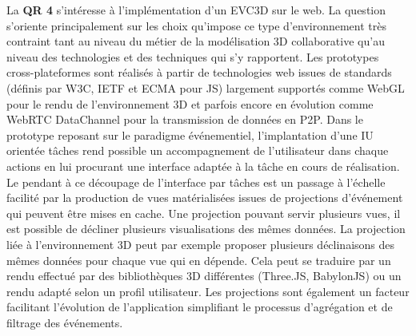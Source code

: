 La \textbf{QR 4} s'intéresse à l'implémentation d'un \gls{EVC3D} sur le web. La 
question s'oriente principalement sur les choix qu'impose ce type d'environnement 
très contraint tant au niveau du métier de la modélisation 3D collaborative 
qu'au niveau des technologies et des techniques qui s'y rapportent.
Les prototypes cross-plateformes sont réalisés à partir de 
technologies web issues de standards (définis par \gls{W3C}, \gls{IETF} et 
\acrshort{ECMA} 
pour \gls{JS}) largement supportés comme WebGL pour le rendu de 
l'environnement 3D et parfois encore en évolution comme WebRTC DataChannel 
pour la transmission de données en \gls{P2P}. 
Dans le prototype reposant sur le paradigme événementiel, l'implantation d'une 
\gls{IU} orientée tâches rend possible un accompagnement de l'utilisateur dans 
chaque actions en lui procurant une interface adaptée à la tâche en cours de 
réalisation. Le pendant à ce découpage de l'interface par tâches est un passage à 
l'échelle facilité par la production de vues matérialisées issues de projections 
d'événement qui peuvent être mises en cache. Une projection pouvant servir 
plusieurs vues, il est possible de décliner plusieurs visualisations des mêmes 
données. La projection liée à l'environnement 3D peut par exemple proposer 
plusieurs déclinaisons des mêmes données pour chaque vue qui en dépende. Cela 
peut se traduire par un rendu effectué par des bibliothèques 3D différentes 
(Three.JS, BabylonJS) ou un rendu adapté selon un profil utilisateur. Les 
projections sont également un facteur facilitant l'évolution de l'application 
simplifiant le processus d'agrégation et de filtrage des événements.

